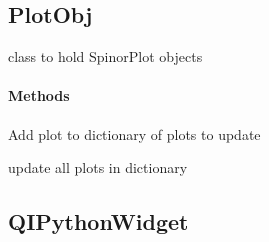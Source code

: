 \documentclass[letterpaper,10pt,english]{sphinxmanual}
\begin{document}
\subsection{PlotObj}
\label{PlotObj:plotobj}\label{PlotObj::doc}

\begin{fulllineitems}
\label{PlotObj:Ipython.PlotObj}
class to hold  SpinorPlot objects
\paragraph{Methods}

\begin{fulllineitems}
\label{PlotObj:Ipython.PlotObj.add_plot}
Add plot to dictionary of plots to update

\end{fulllineitems}


\begin{fulllineitems}
\label{PlotObj:Ipython.PlotObj.update}
update all plots in dictionary

\end{fulllineitems}


\end{fulllineitems}



\subsection{QIPythonWidget}
\label{QIPythonWidget::doc}\label{QIPythonWidget:qipythonwidget}
\end{document}
